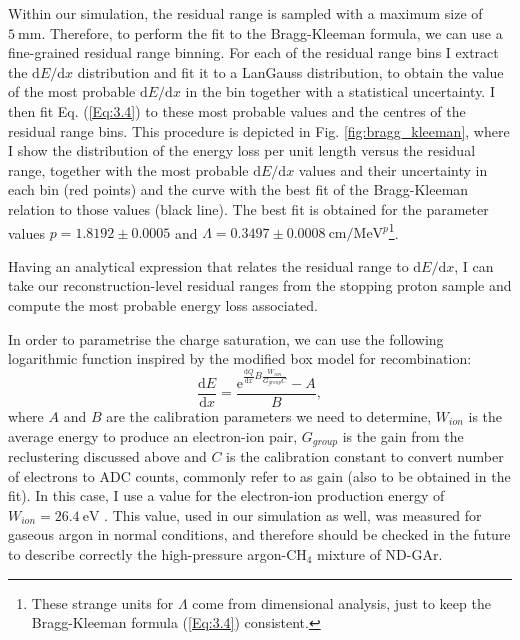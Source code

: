 Within our simulation, the residual range is sampled with a maximum size of $5~\mathrm{mm}$. Therefore, to perform the fit to the Bragg-Kleeman formula, we can use a fine-grained residual range binning. For each of the residual range bins I extract the $\mathrm{d}E/\mathrm{d}x$ distribution and fit it to a LanGauss distribution, to obtain the value of the most probable $\mathrm{d}E/\mathrm{d}x$ in the bin together with a statistical uncertainty. I then fit Eq. (\ref{Eq:3.4}) to these most probable values and the centres of the residual range bins. This procedure is depicted in Fig. \ref{fig:bragg_kleeman}, where I show the distribution of the energy loss per unit length versus the residual range, together with the most probable $\mathrm{d}E/\mathrm{d}x$ values and their uncertainty in each bin (red points) and the curve with the best fit of the Bragg-Kleeman relation to those values (black line). The best fit is obtained for the parameter values $p = 1.8192 \pm 0.0005$ and $\Lambda = 0.3497 \pm 0.0008~\mathrm{cm}/\mathrm{MeV}^{p}$\footnote{These strange units for $\Lambda$ come from dimensional analysis, just to keep the Bragg-Kleeman formula (\ref{Eq:3.4}) consistent.}.

Having an analytical expression that relates the residual range to $\mathrm{d}E/\mathrm{d}x$, I can take our reconstruction-level residual ranges from the stopping proton sample and compute the most probable energy loss associated.

In order to parametrise the charge saturation, we can use the following logarithmic function inspired by the modified box model for recombination:
\begin{equation}\label{Eq:3.5}
	\frac{\mathrm{d}E}{\mathrm{d}x} = \frac{\mathrm{e}^{\frac{\mathrm{d}Q}{\mathrm{d}x}B\frac{W_{ion}}{G_{group}C}}-A}{B},
\end{equation}
where $A$ and $B$ are the calibration parameters we need to determine, $W_{ion}$ is the average energy to produce an electron-ion pair, $G_{group}$ is the gain from the reclustering discussed above and $C$ is the calibration constant to convert number of electrons to ADC counts, commonly refer to as gain (also to be obtained in the fit). In this case, I use a value for the electron-ion production energy of $W_{ion} = 26.4 \ \mathrm{eV}$ \cite{Aprile2008}. This value, used in our simulation as well, was measured for gaseous argon in normal conditions, and therefore should be checked in the future to describe correctly the high-pressure argon-$\mathrm{CH}_{4}$ mixture of ND-GAr.

